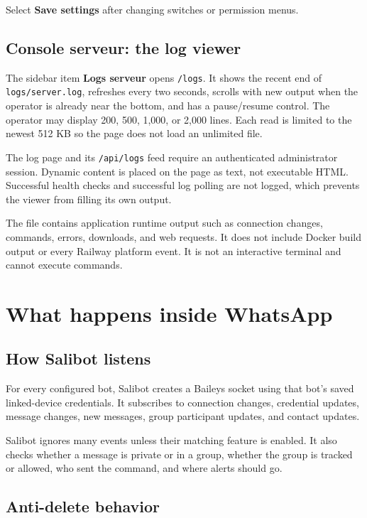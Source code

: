 \documentclass[11pt,a4paper]{article}
\begin{document}
Select \textbf{Save settings} after changing switches or permission menus.

\subsection{Console serveur: the log viewer}

The sidebar item \textbf{Logs serveur} opens \texttt{/logs}. It shows the recent end of \texttt{logs/server.log}, refreshes every two seconds, scrolls with new output when the operator is already near the bottom, and has a pause/resume control. The operator may display 200, 500, 1,000, or 2,000 lines. Each read is limited to the newest 512 KB so the page does not load an unlimited file.

The log page and its \texttt{/api/logs} feed require an authenticated administrator session. Dynamic content is placed on the page as text, not executable HTML. Successful health checks and successful log polling are not logged, which prevents the viewer from filling its own output.

The file contains application runtime output such as connection changes, commands, errors, downloads, and web requests. It does not include Docker build output or every Railway platform event. It is not an interactive terminal and cannot execute commands.

\section{What happens inside WhatsApp}

\subsection{How Salibot listens}

For every configured bot, Salibot creates a Baileys socket using that bot's saved linked-device credentials. It subscribes to connection changes, credential updates, message changes, new messages, group participant updates, and contact updates.

Salibot ignores many events unless their matching feature is enabled. It also checks whether a message is private or in a group, whether the group is tracked or allowed, who sent the command, and where alerts should go.

\subsection{Anti-delete behavior}
\end{document}
